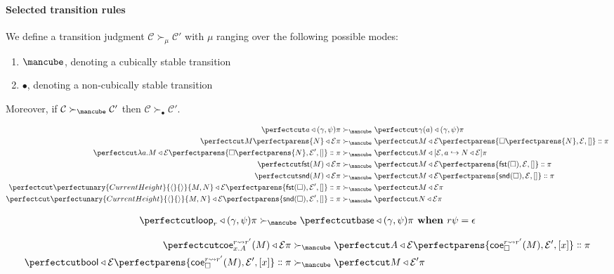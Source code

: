 \documentclass{article}
\newcommand\Clo[2]{#1\triangleleft{#2}}
\newcommand\Coe[4]{\mathsf{coe}^{#1\leadsto{#2}}_{#3} (#4)}
\newcommand\Lam[2]{\lambda{#1}.{#2}}
\newcommand\Fst[1]{\mathsf{fst} (#1)}
\newcommand\Snd[1]{\mathsf{snd} (#1)}
\newcommand\Loop[1]{\mathsf{loop}_{#1}}
\newcommand\Base{\mathsf{base}}
\newcommand\Cons[2]{{#1}\dblcolon{#2}}
\newcommand\Bool{\mathsf{bool}}
\newcommand\Frame[3]{\perfectparens{#1,#2,#3}}
\newcommand\Cfg[3]{\cut{\Clo{#1}{#2}}{#3}}
\newcommand\App[2]{{#1}\perfectparens{#2}}
\newcommand\Pair[2]{\perfectunary{CurrentHeight}{\langle}{\rangle}{#1,#2}}
\newcommand\Stable{\text{\mancube}}
\newcommand\NonStable{\bullet}
\newcommand\Step[3]{{#2}\mathrel{\succ_{#1}}{#3}}
\newcommand\AStep[3]{{#2}&\mathrel{\succ_{#1}}{#3}}
\newcommand\AStepSt[2]{\AStep{\Stable}{#1}{#2}}
\begin{document}
\paragraph{Selected transition rules}

We define a transition judgment
$\Step{\mu}{\mathcal{C}}{\mathcal{C}'}$ with $\mu$ ranging over
the following possible modes:
\begin{enumerate}
\item $\Stable$, denoting a cubically stable transition
\item $\NonStable$, denoting a non-cubically stable transition
\end{enumerate}

Moreover, if $\Step{\Stable}{\mathcal{C}}{\mathcal{C}'}$ then
$\Step{\NonStable}{\mathcal{C}}{\mathcal{C}'}$.


\begin{align}
  \AStepSt{
    \Cfg{a}{(\gamma,\psi)}{\pi}
  }{
    \Cfg{\gamma(a)}{(\gamma,\psi)}{\pi}
  }
  \\
  \AStepSt{
    \Cfg{\App{M}{N}}{\mathcal{E}}{\pi}
  }{
    \Cfg{M}{\mathcal{E}}{\Cons{\Frame{\App{\Box}{N}}{\mathcal{E}}{[]}}{\pi}}
  }
  \\
  \AStepSt{
    \Cfg{\Lam{a}{M}}{\mathcal{E}}{\Cons{\Frame{\App{\Box}{N}}{\mathcal{E}'}{[]}}{\pi}}
  }{
    \Cfg{M}{[\mathcal{E},a\hookrightarrow{\Clo{N}{\mathcal{E}}}]}{\pi}
  }
  \\
  \AStepSt{
    \Cfg{\Fst{M}}{\mathcal{E}}{\pi}
  }{
    \Cfg{M}{\mathcal{E}}{\Cons{\Frame{\Fst{\Box}}{\mathcal{E}}{[]}}{\pi}}
  }
  \\
  \AStepSt{
    \Cfg{\Snd{M}}{\mathcal{E}}{\pi}
  }{
    \Cfg{M}{\mathcal{E}}{\Cons{\Frame{\Snd{\Box}}{\mathcal{E}}{[]}}{\pi}}
  }
  \\
  \AStepSt{
    \Cfg{\Pair{M}{N}}{\mathcal{E}}{\Cons{\Frame{\Fst{\Box}}{\mathcal{E}'}{[]}}{\pi}}
  }{
    \Cfg{M}{\mathcal{E}}{\pi}
  }
  \\
  \AStepSt{
    \Cfg{\Pair{M}{N}}{\mathcal{E}}{\Cons{\Frame{\Snd{\Box}}{\mathcal{E}'}{[]}}{\pi}}
  }{
    \Cfg{N}{\mathcal{E}}{\pi}
  }
\end{align}

\begin{align}
  \AStepSt{
    \Cfg{\Loop{r}}{(\gamma,\psi)}{\pi}
  }{
    \Cfg{\Base}{(\gamma,\psi)}{\pi}
  }
  \textbf{ when } r\psi = \epsilon
  \\
\end{align}

\begin{align}
  \AStepSt{
    \Cfg{\Coe{r}{r'}{x.A}{M}}{\mathcal{E}}{\pi}
  }{
    \Cfg{A}{\mathcal{E}}{
      \Cons{
        \Frame{\Coe{r}{r'}{\Box}{M}}{\mathcal{E}'}{[x]}
      }{\pi}
    }
  }
  \\
  \AStepSt{
    \Cfg{\Bool}{\mathcal{E}}{
      \Cons{\Frame{\Coe{r}{r'}{\Box}{M}}{\mathcal{E}'}{[x]}}{\pi}
    }
  }{
    \Cfg{M}{\mathcal{E}'}{\pi}
  }
\end{align}
\end{document}
